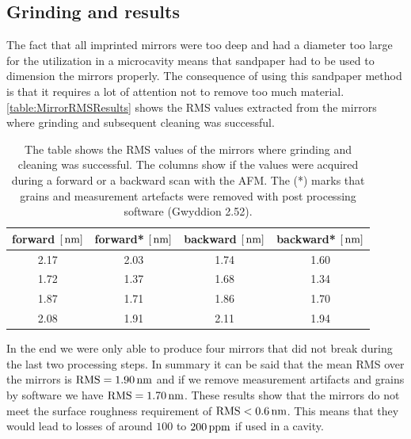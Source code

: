 \subsection{Grinding and results}
The fact that all imprinted mirrors were too deep and had a diameter too large for the utilization in a microcavity means that sandpaper had to be used to dimension the mirrors properly. The consequence of using this sandpaper method is that it requires a lot of attention not to remove too much material. \autoref{table:MirrorRMSResults} shows the RMS values extracted from the mirrors where grinding and subsequent cleaning was successful.

\begin{table}[H]
	\begin{tabular}{cccc}
	\hline
	\textbf{forward $[\nm]$} & \textbf{forward* $[\nm]$} & \textbf{backward $[\nm]$} & \textbf{backward* $[\nm]$} \\
	\hline
	2.17 & 2.03 & 1.74 & 1.60 \\
	1.72 & 1.37 & 1.68 & 1.34 \\
	1.87 & 1.71 & 1.86 & 1.70 \\
	2.08 & 1.91 & 2.11 & 1.94 \\
	\hline
	\end{tabular}
	\caption{The table shows the RMS values of the mirrors where grinding and cleaning was successful. The columns show if the values were acquired during a forward or a backward scan with the AFM. The (*) marks that grains and measurement artefacts were removed with post processing software (Gwyddion 2.52).}
	\label{table:MirrorRMSResults}
\end{table}

In the end we were only able to produce four mirrors that did not break during the last two processing steps. In summary it can be said that the mean RMS over the mirrors is $\si{RMS}=1.90\nm$ and if we remove measurement artifacts and grains by software we have $\si{RMS}=1.70\nm$. These results show that the mirrors do not meet the surface roughness requirement of $\si{RMS}<0.6\nm$. This means that they would lead to losses of around $100$ to $200\ppm$ if used in a cavity.

